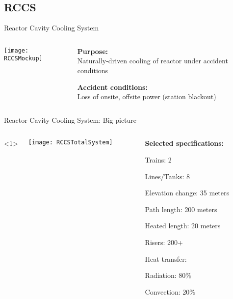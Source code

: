     \subsection*{RCCS}
    \begin{frame}{Reactor Cavity Cooling System}
        \begin{columns}
            \begin{column}[T]{0.45\textwidth}
                \texttt{[image: RCCSMockup]}
            \end{column}
            \begin{column}[T]{0.45\textwidth}
                \textbf{Purpose:}\hfill\\
                Naturally-driven cooling of reactor under accident conditions
                
                \vspace*{2em}
                \textbf{Accident conditions:}\hfill\\
                Loss of onsite, offsite power (station blackout)
            \end{column}
        \end{columns}
    \end{frame}
    

    \begin{frame}{Reactor Cavity Cooling System: Big picture}
    \begin{columns}<1>
        \begin{column}[T]{0.45\textwidth}
            \texttt{[image: RCCSTotalSystem]}
        \end{column}
         \begin{column}[T]{0.45\textwidth}
            \textbf{Selected specifications:}\\[0.2em]
            \begin{Itemize}
                \item{Trains: 2}
                \item{Lines/Tanks: 8}
                \item{Elevation change: 35 meters}
                \item{Path length: 200 meters}
                \item{Heated length: 20 meters}
                \item{Risers: 200+}
                \item{Heat transfer:}
                \begin{Itemize}
                    \item{Radiation: 80\%}
                    \item{Convection: 20\%}
                \end{Itemize}
            \end{Itemize}
        \end{column}
    \end{columns}
\end{frame}


